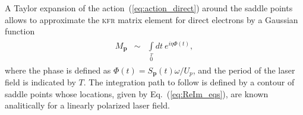 A Taylor expansion of the action~(\ref{eq:action_direct}) around the
saddle points allows to approximate the \textsc{kfr} matrix element
for direct electrons by a Gaussian function~\cite{phd_Kopold}
%
\begin{eqnarray}
  \label{eq:KFR_Mp}
  \begin{split}
    M_{\mathbf{p}} & \sim & \int\limits_{0}\limits^{T} dt\ e^{i \eta \Phi(t)},
  \end{split}
\end{eqnarray}
%
where the phase is defined as $\Phi(t) = S_{\mathbf{p}}(t)\omega /
U_{p}$, and the period of the laser field is indicated by $T$. The
integration path to follow is defined by a contour of saddle points
whose locations, given by Eq.~(\ref{eq:ReIm_eqs}), are known
analitically for a linearly polarized laser field.


